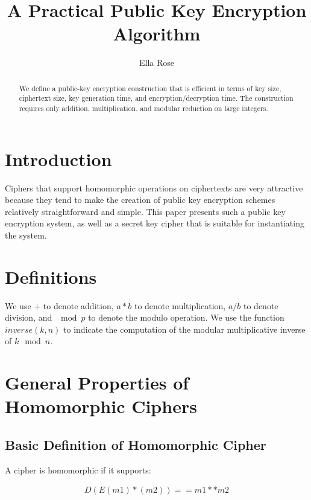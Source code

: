 \documentclass[preprint]{iacrtrans}
\author{Ella Rose}
\institute{Paso Robles, CA \email{python_pride@protonmail.com}}
\title[A Practical Public Key Encryption Algorithm]{A Practical Public Key Encryption Algorithm}
\begin{document}
\maketitle


\begin{abstract}
 We define a public-key encryption construction that is efficient in terms of key size, ciphertext size, key generation time, and encryption/decryption time. The construction requires only addition, multiplication, and modular reduction on large integers.
 \end{abstract}

\todototoc
\listoftodos


\section{Introduction}
 Ciphers that support homomorphic operations on ciphertexts are very attractive because they tend to make the creation of public key encryption schemes relatively straightforward and simple. This paper presents such a public key encryption system, as well as a secret key cipher that is suitable for instantiating the system.

\section{Definitions}
We use $+$ to denote addition, $a * b$ to denote multiplication, $a / b$ to denote division, and $\mod p$ to denote the modulo operation. We use the function $inverse(k, n)$ to indicate the computation of the modular multiplicative inverse of $k \mod n$.

\section{General Properties of Homomorphic Ciphers}
\subsection{Basic Definition of Homomorphic Cipher}
A cipher is homomorphic if it supports:

\begin{align}
 D(E(m1) * (m2)) == m1 ** m2
\end{align}
\end{document}
